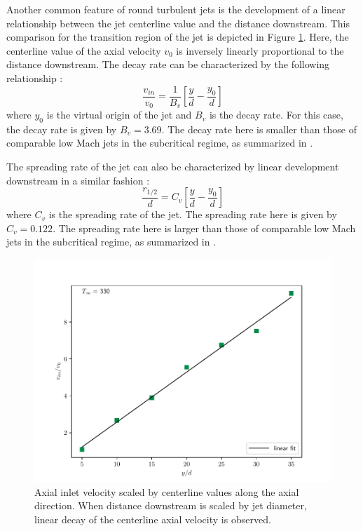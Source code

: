 Another common feature of round turbulent jets is the development of a linear relationship between the jet centerline value and the distance downstream. This comparison for the transition region of the jet is depicted in Figure \ref{330_centerline_scaling}. Here, the centerline value of the axial velocity $v_0$ is inversely linearly proportional to the distance downstream. The decay rate can be characterized by the following relationship \cite{iso_comp_1}:
\begin{equation} \label{decay_rate}
\dfrac{v_{in}}{v_0} = \dfrac{1}{B_v}\left[ \dfrac{y}{d} - \dfrac{y_0}{d} \right]
\end{equation}
where $y_0$ is the virtual origin of the jet \cite{Pope} and $B_v$ is the decay rate. For this case, the decay rate is given by $B_v = 3.69$.  The decay rate here is smaller than those of comparable low Mach jets in the subcritical regime, as summarized in \cite{iso_comp_1_ref_1}. 

The spreading rate of the jet can also be characterized by linear development downstream in a similar fashion \cite{iso_comp_1_ref_1}:
\begin{equation} \label{spread_rate}
\dfrac{r_{1/2}}{d} = C_v\left[ \dfrac{y}{d} - \dfrac{y_0}{d} \right]
\end{equation}
where $C_v$ is the spreading rate of the jet. The spreading rate here is given by $C_v=0.122$. The spreading rate here is larger than those of comparable low Mach jets in the subcritical regime, as summarized in \cite{iso_comp_1_ref_1}. 

\begin{figure}[H]
\begin{center}
	\includegraphics[scale=.7]{figures/Plots/radial/slices_5/same_ambient/uin_u0_vs_x_d.pdf}
	\caption{Axial inlet velocity scaled by centerline values along the axial direction. When distance downstream is scaled by jet diameter, linear decay of the centerline axial velocity is observed.} \label{330_centerline_scaling}
\end{center}
\end{figure}

